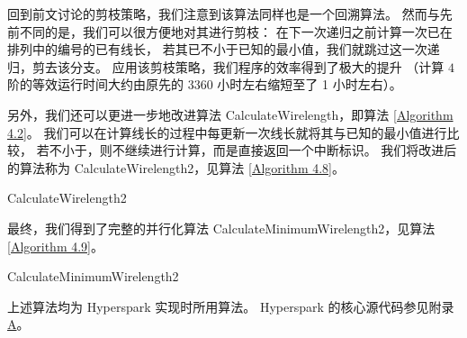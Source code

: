 回到前文讨论的剪枝策略，我们注意到该算法同样也是一个回溯算法。
然而与先前不同的是，我们可以很方便地对其进行剪枝：
在下一次递归之前计算一次已在排列中的编号的已有线长，
若其已不小于已知的最小值，我们就跳过这一次递归，剪去该分支。
应用该剪枝策略，我们程序的效率得到了极大的提升
（计算 $4$ 阶的等效运行时间大约由原先的 3360 小时左右缩短至了 1 小时左右）。

另外，我们还可以更进一步地改进算法 CalculateWirelength，即算法 \ref{Algorithm 4.2}。
我们可以在计算线长的过程中每更新一次线长就将其与已知的最小值进行比较，
若不小于，则不继续进行计算，而是直接返回一个中断标识。
我们将改进后的算法称为 CalculateWirelength2，见算法 \ref{Algorithm 4.8}。

\begin{algorithm}[h!]
\caption{CalculateWirelength2}
\label{Algorithm 4.8}
\begin{algorithmic}[1]
	 
	 

			 
					 
				\EndIf
			\EndIf
		\EndFor
	\EndFor
\end{algorithmic}
\end{algorithm}

最终，我们得到了完整的并行化算法 CalculateMinimumWirelength2，见算法 \ref{Algorithm 4.9}。

\begin{algorithm}[h!]
\caption{CalculateMinimumWirelength2}
\label{Algorithm 4.9}
\begin{algorithmic}[1]
	 
	 
	 
	 

	 
		 
		 
	\EndFor
\end{algorithmic}
\end{algorithm}

上述算法均为 Hyperspark 实现时所用算法。
Hyperspark 的核心源代码参见附录 \hyperref[Appendix A]{A}。
